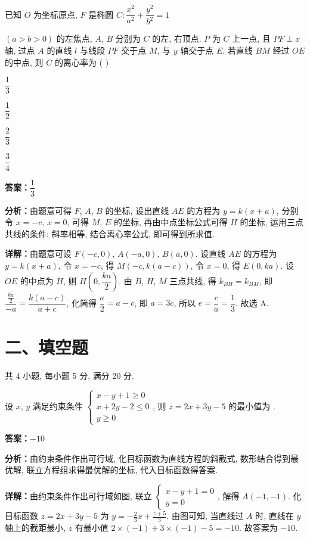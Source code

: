 \begin{question}[points=5]
已知 $O$ 为坐标原点, $F$ 是椭圆 $C:\dfrac{x^2}{a^2}+\dfrac{y^2}{b^2}=1$

$(a>b>0)$ 的左焦点, $A$, $B$ 分别为 $C$ 的左, 右顶点. $P$ 为 $C$ 上一点, 且 $PF\perp x$ 轴, 过点 $A$ 的直线 $l$ 与线段 $PF$ 交于点 $M$, 与 $y$ 轴交于点 $E$. 若直线 $BM$ 经过 $OE$ 的中点, 则 $C$ 的离心率为 ( )
\begin{choices}
  \item $\dfrac{1}{3}$
  \item $\dfrac{1}{2}$
  \item $\dfrac{2}{3}$
  \item $\dfrac{3}{4}$
\end{choices}
\begin{solution}
\textbf{答案：}$\dfrac{1}{3}$

\textbf{分析：}由题意可得 $F$, $A$, $B$ 的坐标, 设出直线 $AE$ 的方程为 $y=k(x+a)$, 分别令 $x=-c$, $x=0$, 可得 $M$, $E$ 的坐标, 再由中点坐标公式可得 $H$ 的坐标, 运用三点共线的条件: 斜率相等, 结合离心率公式, 即可得到所求值.

\textbf{详解：}由题意可设 $F(-c,0)$, $A(-a,0)$, $B(a,0)$. 设直线 $AE$ 的方程为 $y=k(x+a)$, 令 $x=-c$, 得 $M(-c,k(a-c))$, 令 $x=0$, 得 $E(0,ka)$. 设 $OE$ 的中点为 $H$, 则 $H(0,\dfrac{ka}{2})$. 由 $B$, $H$, $M$ 三点共线, 得 $k_{BH}=k_{BM}$, 即 $\dfrac{\frac{ka}{2}}{-a}=\dfrac{k(a-c)}{a+c}$, 化简得 $\dfrac{a}{2}=a-c$, 即 $a=3c$, 所以 $e=\dfrac{c}{a}=\dfrac{1}{3}$. 故选 A.
\end{solution}
\end{question}

\section*{二、填空题}
共 4 小题, 每小题 5 分, 满分 20 分.

\begin{question}[points=5]
设 $x$, $y$ 满足约束条件 $\begin{cases}x-y+1\ge 0\\ x+2y-2\le 0\\ y\ge 0\end{cases}$, 则 $z=2x+3y-5$ 的最小值为 .
\fillin[{$-10$}]
\begin{solution}
\textbf{答案：}$-10$

\textbf{分析：}由约束条件作出可行域, 化目标函数为直线方程的斜截式, 数形结合得到最优解, 联立方程组求得最优解的坐标, 代入目标函数得答案.

\textbf{详解：}由约束条件作出可行域如图, 联立 $\begin{cases}x-y+1=0\\ y=0\end{cases}$, 解得 $A(-1,-1)$. 化目标函数 $z=2x+3y-5$ 为 $y=-\frac{2}{3}x+\frac{z+5}{3}$. 由图可知, 当直线过 $A$ 时, 直线在 $y$ 轴上的截距最小, $z$ 有最小值 $2\times(-1)+3\times(-1)-5=-10$. 故答案为 $-10$.
\end{solution}
\end{question}

